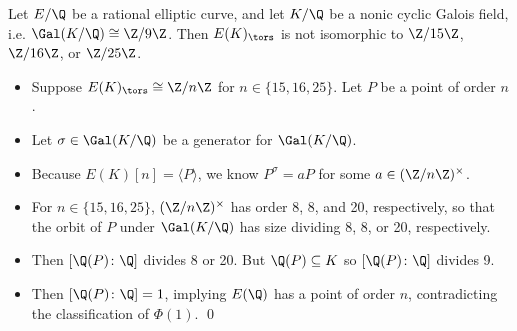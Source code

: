 \begin{frame}[plain]
\end{frame}





\begin{frame}[plain]
\footnotesize
\begin{lem}
Let $E/\Q$ be a rational elliptic curve, and let $K/\Q$ be a nonic cyclic Galois field, i.e. $\Gal(K/\Q) \cong \Z/9\Z$. Then $E(K)_\tors$ is not isomorphic to $\Z/15\Z$, $\Z/16\Z$, or $\Z/25\Z$.
\end{lem} \pspace

\pf
\begin{itemize}
\item Suppose $E(K)_\tors \cong \Z/n\Z$ for $n \in \{ 15, 16, 25 \}$. Let $P$ be a point of order $n$.
\item Let $\sigma \in \Gal(K/\Q)$ be a generator for $\Gal(K/\Q)$.
\item Because $E(K)[n]= \langle P \rangle$, we know $P^\sigma= aP$ for some $a \in (\Z/n\Z)^\times$. 
\item For $n \in \{ 15, 16, 25 \}$, $(\Z/n\Z)^\times$ has order 8, 8, and 20, respectively, so that the orbit of $P$ under $\Gal(K/\Q)$ has size dividing 8, 8, or 20, respectively.
\item Then $[\Q(P) \colon \Q]$ divides 8 or 20. But $\Q(P) \subseteq K$ so $[\Q(P) \colon \Q]$ divides 9. 
\item Then $[\Q(P) \colon \Q]= 1$, implying $E(\Q)$ has a point of order $n$, contradicting the classification of $\Phi(1)$. \hfill\qed
\end{itemize}
\end{frame}





